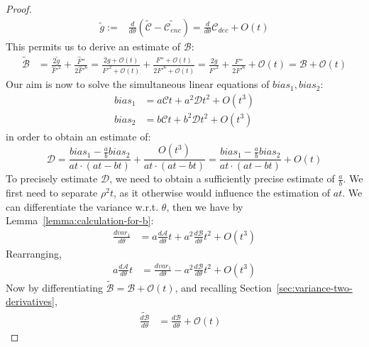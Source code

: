\begin{proof}
\begin{align*}
    \tilde{g} := &\frac{d}{d\theta} \left(\tilde{\mathcal{C}} - \tilde{\mathcal{C}_{enc}}\right) = \frac{d}{d\theta} \mathcal{C}_{dec} + O(t)
\end{align*}
    This permits us to derive an estimate of $\mathcal{B}$:
    \begin{align*}
    \tilde{\mathcal{B}} &= \frac{2\tilde{g}}{\widehat{F}'^2} + \frac{\widehat{F}''}{2\widehat{F}'^6} %
     = \frac{2g + \mathcal{O}(t)}{F'^2 + \mathcal{O}(t)} + \frac{F'' + \mathcal{O}(t)}{2F'^6 + \mathcal{O}(t)} %
     = \frac{2g}{F'^2} + \frac{F''}{2F'^6} + \mathcal{O}(t)  %
     = \mathcal{B} + \mathcal{O}(t) %
\end{align*}
Our aim is now to solve the simultaneous linear equations of $bias_1, bias_2$:
    \begin{align*}
        bias_1 &= a\mathcal{C}t + a^2\mathcal{D}t^2 + O(t^3)\\
        bias_2 &= b\mathcal{C}t + b^2\mathcal{D}t^2 + O(t^3)
    \end{align*}
in order to obtain an estimate of:
\begin{equation*}
    \mathcal{D} = \frac{bias_1 - \frac{a}{b}bias_2}{at \cdot (at - bt)} + \frac{O(t^3)}{at \cdot (at - bt)} = \frac{bias_1 - \frac{a}{b}bias_2}{at \cdot (at - bt)} + O(t)
\end{equation*}
To precisely estimate $\mathcal{D}$, we need to obtain a sufficiently precise estimate of  $\frac{a}{b}$. We first need to separate $\rho^2t$, as it otherwise would influence the estimation of $at$. %
We can differentiate the variance w.r.t. $\theta$, then we have by Lemma~\ref{lemma:calculation-for-b}:
\begin{align*}
    \frac{d var_1}{d \theta} &= a\frac{d \mathcal{A}}{d \theta}t + a^2 \frac{d \mathcal{B}}{d \theta} t^2 + O(t^3)
    \end{align*}
Rearranging,
    \begin{align*}
    a\frac{d \mathcal{A}}{d \theta}t &= \frac{d var_1}{d \theta} - a^2\frac{d \mathcal{B}}{d \theta} t^2 + O(t^3)
    \end{align*}
    Now by differentiating $\tilde{\mathcal{B}} = \mathcal{B} + \mathcal{O}(t)$, and recalling Section~\ref{sec:variance-two-derivatives},
    \begin{align*}
    \tilde{\frac{d \mathcal{B}}{d \theta}} &= \frac{d \mathcal{B}}{d \theta} + \mathcal{O}(t) &

\end{align*}
\end{proof}

